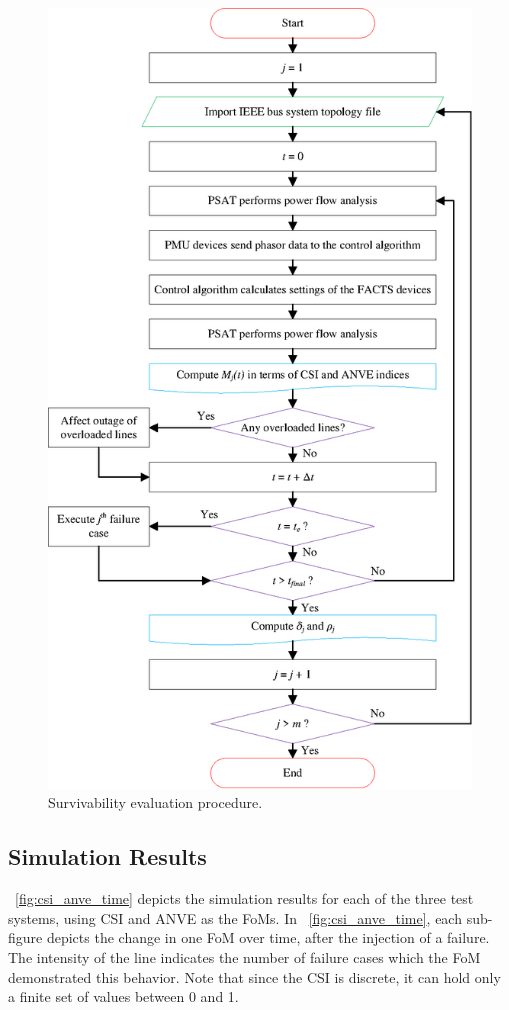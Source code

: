 \documentclass[review]{elsarticle}
\begin{document}
\begin{figure}[!ht]
\centering
\includegraphics[width=0.70\columnwidth]{simulation_flowchart}
\caption{Survivability evaluation procedure.}
\label{fig:sim_flowchart}
\end{figure}

\subsection{Simulation Results}
\label{sec:case_study:results}
\figurename~\ref{fig:csi_anve_time} depicts the simulation results for each of the three test systems, using CSI and ANVE as the FoMs. In \figurename~\ref{fig:csi_anve_time}, each sub-figure depicts the change in one FoM over time, after the injection of a failure. The intensity of the line indicates the number of failure cases which the FoM demonstrated this behavior. Note that since the CSI is discrete, it can hold only a finite set of values between 0 and 1.
\end{document}
